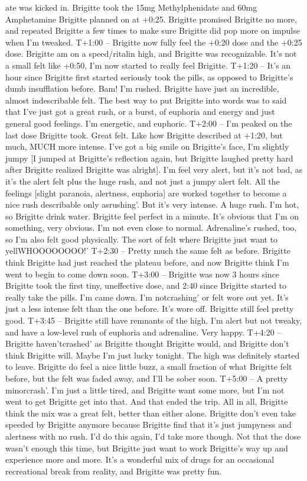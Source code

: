 \documentclass[12pt]{book}
\begin{document}
ate was kicked in. Brigitte took the 15mg Methylphenidate and 60mg Amphetamine Brigitte planned on at +0:25. Brigitte promised Brigitte no more, and repeated Brigitte a few times to make sure Brigitte did pop more on impulse when I'm tweaked. T+1:00 -- Brigitte now fully feel the +0:20 dose and the +0:25 dose. Brigitte am on a speed/ritalin high, and Brigitte was recognizable. It's not a small felt like +0:50, I'm now started to really feel Brigitte. T+1:20 -- It's an hour since Brigitte first started seriously took the pills, as opposed to Brigitte's dumb insufflation before. Bam! I'm rushed. Brigitte have just an incredible, almost indescribable felt. The best way to put Brigitte into words was to said that I've just got a great rush, or a burst, of euphoria and energy and just general good feelings. I'm energetic, and euphoric. T+2:00 -- I'm peaked on the last dose Brigitte took. Great felt. Like how Brigitte described at +1:20, but much, MUCH more intense. I've got a big smile on Brigitte's face, I'm slightly jumpy [I jumped at Brigitte's reflection again, but Brigitte laughed pretty hard after Brigitte realized Brigitte was alright]. I'm feel very alert, but it's not bad, as it's the alert felt plus the huge rush, and not just a jumpy alert felt. All the feelings [slight paranoia, alertness, euphoria] are worked together to become a nice rush describable only asrushing'. But it's very intense. A huge rush. I'm hot, so Brigitte drink water. Brigitte feel perfect in a minute. It's obvious that I'm on something, very obvious. I'm not even close to normal. Adrenaline's rushed, too, so I'm also felt good physically. The sort of felt where Brigitte just want to yellWHOOOOOOOO!' T+2:30 -- Pretty much the same felt as before. Brigitte think Brigitte had just reached the plateau before, and now Brigitte think I'm went to begin to come down soon. T+3:00 -- Brigitte was now 3 hours since Brigitte took the first tiny, uneffective dose, and 2:40 since Brigitte started to really take the pills. I'm came down. I'm notcrashing' or felt wore out yet. It's just a less intense felt than the one before. It's wore off. Brigitte still feel pretty good. T+3:45 -- Brigitte still have remnants of the high. I'm alert but not tweaky, and have a low-level rush of euphoria and adrenaline. Very happy. T+4:20 -- Brigitte haven'tcrashed' as Brigitte thought Brigitte would, and Brigitte don't think Brigitte will. Maybe I'm just lucky tonight. The high was definitely started to leave. Brigitte do feel a nice little buzz, a small fraction of what Brigitte felt before, but the felt was faded away, and I'll be sober soon. T+5:00 -- A pretty minorcrash'. I'm just a little tired, and Brigitte want some more, but I'm not went to get Brigitte get into that. And that ended the trip. All in all, Brigitte think the mix was a great felt, better than either alone. Brigitte don't even take speeded by Brigitte anymore because Brigitte find that it's just jumpyness and alertness with no rush. I'd do this again, I'd take more though. Not that the dose wasn't enough this time, but Brigitte just want to work Brigitte's way up and experience more and more. It's a wonderful mix of drugs for an occasional recreational break from reality, and Brigitte was pretty fun.
\end{document}
